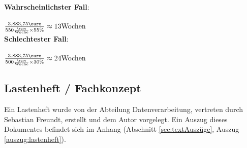 \textbf{Wahrscheinlichster Fall}:\\
\\
$\frac{3.883,75\text{\euro}}{550\frac{\text{\euro}}{\text{Woche}} \times 55\text{\%}} \approx 13 \text{Wochen}$
\\


\textbf{Schlechtester Fall}:\\
\\
$\frac{3.883,75\text{\euro}}{500\frac{\text{\euro}}{\text{Woche}} \times 30\text{\%}} \approx 24 \text{Wochen}$
\\

\subsection{Lastenheft / Fachkonzept}
Ein Lastenheft wurde von der Abteilung Datenverarbeitung, vertreten durch Sebastian Freundt,
erstellt und dem Autor vorgelegt. Ein Auszug dieses Dokumentes befindet sich im Anhang  (Abschnitt \ref{sec:textAuszüge}, Auszug \ref{auszug:lastenheft}).\par

